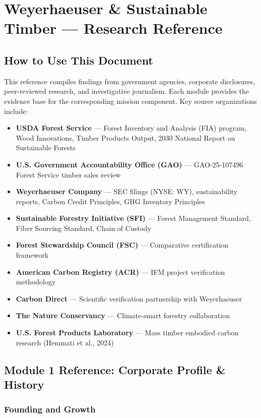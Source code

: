 \documentclass[11pt,letterpaper]{article}
\begin{document}
\section{Weyerhaeuser \& Sustainable Timber --- Research Reference}

\subsection{How to Use This Document}

This reference compiles findings from government agencies, corporate disclosures, peer-reviewed research, and investigative journalism. Each module provides the evidence base for the corresponding mission component. Key source organizations include:

\begin{itemize}[leftmargin=2em]
\item \textbf{USDA Forest Service} --- Forest Inventory and Analysis (FIA) program, Wood Innovations, Timber Products Output, 2030 National Report on Sustainable Forests
\item \textbf{U.S. Government Accountability Office (GAO)} --- GAO-25-107496 Forest Service timber sales review
\item \textbf{Weyerhaeuser Company} --- SEC filings (NYSE: WY), sustainability reports, Carbon Credit Principles, GHG Inventory Principles
\item \textbf{Sustainable Forestry Initiative (SFI)} --- Forest Management Standard, Fiber Sourcing Standard, Chain of Custody
\item \textbf{Forest Stewardship Council (FSC)} --- Comparative certification framework
\item \textbf{American Carbon Registry (ACR)} --- IFM project verification methodology
\item \textbf{Carbon Direct} --- Scientific verification partnership with Weyerhaeuser
\item \textbf{The Nature Conservancy} --- Climate-smart forestry collaboration
\item \textbf{U.S. Forest Products Laboratory} --- Mass timber embodied carbon research (Hemmati et al., 2024)
\end{itemize}

\subsection{Module 1 Reference: Corporate Profile \& History}

\subsubsection{Founding and Growth}
\end{document}
